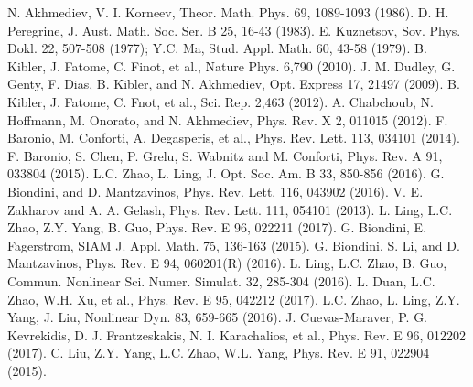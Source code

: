 \documentclass[aps,twocolumn,showpacs]{revtex4}
\begin{document}
\begin{thebibliography}{99}
 N. Akhmediev, V. I. Korneev, Theor. Math. Phys. 69,
1089-1093 (1986).
 D. H. Peregrine,  J. Aust. Math. Soc. Ser. B 25, 16-43
(1983).
 E. Kuznetsov, Sov. Phys. Dokl. 22, 507-508 (1977); Y.C. Ma, Stud. Appl. Math. 60, 43-58 (1979).
 B. Kibler, J. Fatome, C. Finot,   et al.,  Nature
Phys. 6,790 (2010).
 J. M. Dudley, G. Genty, F. Dias, B. Kibler, and N. Akhmediev,
 Opt. Express 17, 21497 (2009).
 B. Kibler, J. Fatome, C. Fnot, et
al.,   Sci. Rep. 2,463 (2012).
 A. Chabchoub, N. Hoffmann, M. Onorato, and N. Akhmediev, Phys. Rev. X 2,
 011015 (2012).
 F. Baronio, M. Conforti, A. Degasperis, et al.,
Phys. Rev. Lett. 113, 034101 (2014).
  F. Baronio, S. Chen, P. Grelu, S. Wabnitz and M. Conforti, Phys. Rev. A 91,
033804 (2015).
 L.C. Zhao, L. Ling, J. Opt. Soc. Am. B 33, 850-856 (2016).
 G. Biondini,
and D. Mantzavinos, Phys. Rev. Lett. 116, 043902 (2016).
 V. E. Zakharov and A. A. Gelash, Phys. Rev. Lett. 111, 054101 (2013).
 L. Ling, L.C. Zhao, Z.Y. Yang, B. Guo, Phys. Rev. E 96, 022211 (2017).
 G. Biondini,  E. Fagerstrom,  SIAM  J. Appl. Math. 75,   136-163 (2015).
 G. Biondini, S. Li, and D. Mantzavinos, Phys. Rev. E 94, 060201(R) (2016).
 L. Ling, L.C. Zhao, B. Guo, Commun. Nonlinear Sci. Numer. Simulat. 32, 285-304 (2016).
 L. Duan, L.C. Zhao, W.H. Xu, et al., Phys. Rev. E 95, 042212 (2017).
 L.C. Zhao, L. Ling, Z.Y. Yang, J. Liu, Nonlinear Dyn.  83,  659-665
(2016).
 J. Cuevas-Maraver, P. G. Kevrekidis, D. J. Frantzeskakis, N. I. Karachalios, et al., Phys. Rev. E 96, 012202 (2017).
 C. Liu, Z.Y. Yang, L.C. Zhao, W.L. Yang, Phys. Rev. E 91, 022904 (2015).


\end{thebibliography}
\end{document}
